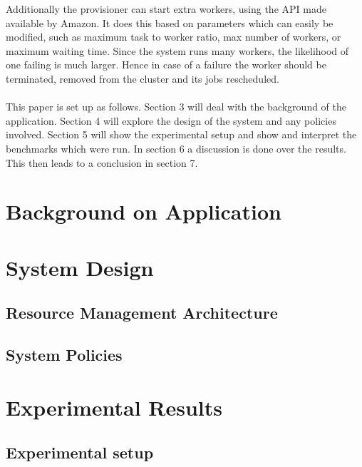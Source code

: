\documentclass[a4paper]{IEEEtran}
\begin{document}
Additionally the provisioner can start extra workers, using the API made available by Amazon. It does this based on parameters which can easily be modified, such as maximum task to worker ratio, max number of workers, or maximum waiting time. Since the system runs many workers, the likelihood of one failing is much larger. Hence in case of a failure the worker should be terminated, removed from the cluster and its jobs rescheduled.\\
\\
This paper is set up as follows. Section 3 will deal with the background of the application. Section 4 will explore the design of the system and any policies involved. Section 5 will show the experimental setup and show and interpret the benchmarks which were run. In section 6 a discussion is done over the results. This then leads to a conclusion in section 7.

\section{Background on Application}

\section{System Design}

\subsection{Resource Management Architecture}






\subsection{System Policies}


\section{Experimental Results}

\subsection{Experimental setup}
\end{document}
